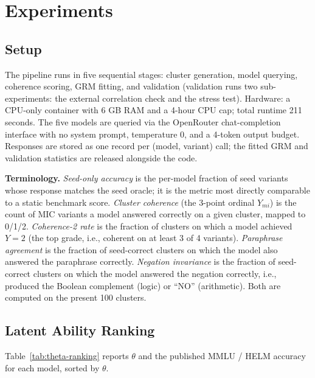 \documentclass[11pt,letterpaper]{article}
\begin{document}
\section{Experiments}
\label{sec:experiments}

\subsection{Setup}

The pipeline runs in five sequential stages: cluster generation, model querying, coherence scoring, GRM fitting, and validation (validation runs two sub-experiments: the external correlation check and the stress test). Hardware: a CPU-only container with 6 GB RAM and a 4-hour CPU cap; total runtime 211 seconds. The five models are queried via the OpenRouter chat-completion interface with no system prompt, temperature 0, and a 4-token output budget. Responses are stored as one record per (model, variant) call; the fitted GRM and validation statistics are released alongside the code.

\textbf{Terminology.} \emph{Seed-only accuracy} is the per-model fraction of seed variants whose response matches the seed oracle; it is the metric most directly comparable to a static benchmark score. \emph{Cluster coherence} (the 3-point ordinal $Y_{mi}$) is the count of MIC variants a model answered correctly on a given cluster, mapped to 0/1/2. \emph{Coherence-2 rate} is the fraction of clusters on which a model achieved $Y = 2$ (the top grade, i.e., coherent on at least 3 of 4 variants). \emph{Paraphrase agreement} is the fraction of seed-correct clusters on which the model also answered the paraphrase correctly. \emph{Negation invariance} is the fraction of seed-correct clusters on which the model answered the negation correctly, i.e., produced the Boolean complement (logic) or ``NO'' (arithmetic). Both are computed on the present 100 clusters.

\subsection{Latent Ability Ranking}

Table~\ref{tab:theta-ranking} reports $\theta$ and the published MMLU / HELM accuracy for each model, sorted by $\theta$.
\end{document}
